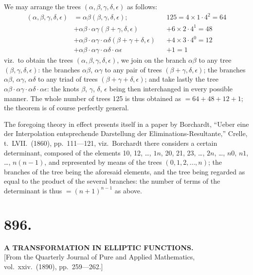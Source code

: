 \documentclass[11pt,a4paper]{book}
\begin{document}
We may arrange the trees $(\alpha, \beta, \gamma, \delta, \epsilon)$ as follows:
\begin{align*}
(\alpha, \beta, \gamma, \delta, \epsilon) &= \alpha\beta(\beta, \gamma, \delta, \epsilon); && 125 = 4 \times 1 \cdot 4^2 = 64 \\
&+ \alpha\beta \cdot \alpha\gamma(\beta + \gamma, \delta, \epsilon) && + 6 \times 2 \cdot 4^1 = 48 \\
&+ \alpha\beta \cdot \alpha\gamma \cdot \alpha\delta(\beta + \gamma + \delta, \epsilon) && + 4 \times 3 \cdot 4^0 = 12 \\
&+ \alpha\beta \cdot \alpha\gamma \cdot \alpha\delta \cdot \alpha\epsilon && + 1 = 1
\end{align*}
viz.\ to obtain the trees $(\alpha, \beta, \gamma, \delta, \epsilon)$, we join on the branch $\alpha\beta$ to any tree $(\beta, \gamma, \delta, \epsilon)$: the branches $\alpha\beta$, $\alpha\gamma$ to any pair of trees $(\beta + \gamma, \delta, \epsilon)$; the branches $\alpha\beta$, $\alpha\gamma$, $\alpha\delta$ to any triad of trees $(\beta + \gamma + \delta, \epsilon)$; and take lastly the tree $\alpha\beta \cdot \alpha\gamma \cdot \alpha\delta \cdot \alpha\epsilon$: the knots $\beta$, $\gamma$, $\delta$, $\epsilon$ being then interchanged in every possible manner. The whole number of trees 125 is thus obtained as $= 64 + 48 + 12 + 1$; the theorem is of course perfectly general.

The foregoing theory in effect presents itself in a paper by Borchardt, ``Ueber eine der Interpolation entsprechende Darstellung der Eliminations-Resultante,'' Crelle, t.\ LVII.\ (1860), pp.\ 111---121, viz.\ Borchardt there considers a certain determinant, composed of the elements 10, 12, \ldots, $1n$, 20, 21, 23, \ldots, $2n$, \ldots, $n0$, $n1$, \ldots, $n(n-1)$, and represented by means of the trees $(0, 1, 2, \ldots, n)$; the branches of the tree being the aforesaid elements, and the tree being regarded as equal to the product of the several branches: the number of terms of the determinant is thus $= (n+1)^{n-1}$ as above.


\section*{896.}
\begin{center}
{\large\bfseries A TRANSFORMATION IN ELLIPTIC FUNCTIONS.}\\[0.5em]
\small [From the Quarterly Journal of Pure and Applied Mathematics, vol.\ xxiv.\ (1890), pp.\ 259---262.]
\end{center}
\end{document}
